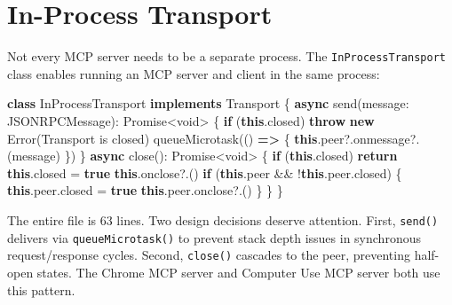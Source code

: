 \documentclass[
  english,
  11pt,
  letterpaper,
]{book}
\newenvironment{Shaded}{\begin{snugshade}}{\end{snugshade}}
\newcommand{\AttributeTok}[1]{\textcolor[rgb]{0.40,0.45,0.13}{#1}}
\newcommand{\BuiltInTok}[1]{\textcolor[rgb]{0.00,0.23,0.31}{#1}}
\newcommand{\ControlFlowTok}[1]{\textcolor[rgb]{0.00,0.23,0.31}{\textbf{#1}}}
\newcommand{\DataTypeTok}[1]{\textcolor[rgb]{0.68,0.00,0.00}{#1}}
\newcommand{\FunctionTok}[1]{\textcolor[rgb]{0.28,0.35,0.67}{#1}}
\newcommand{\KeywordTok}[1]{\textcolor[rgb]{0.00,0.23,0.31}{\textbf{#1}}}
\newcommand{\NormalTok}[1]{\textcolor[rgb]{0.00,0.23,0.31}{#1}}
\newcommand{\OperatorTok}[1]{\textcolor[rgb]{0.37,0.37,0.37}{#1}}
\newcommand{\StringTok}[1]{\textcolor[rgb]{0.13,0.47,0.30}{#1}}
\begin{document}
\section{In-Process Transport}\label{in-process-transport}

Not every MCP server needs to be a separate process. The
\texttt{InProcessTransport} class enables running an MCP server and
client in the same process:

\begin{Shaded}
\begin{Highlighting}[]
\KeywordTok{class}\NormalTok{ InProcessTransport }\KeywordTok{implements}\NormalTok{ Transport \{}
  \KeywordTok{async} \FunctionTok{send}\NormalTok{(message}\OperatorTok{:}\NormalTok{ JSONRPCMessage)}\OperatorTok{:} \BuiltInTok{Promise}\OperatorTok{\textless{}}\DataTypeTok{void}\OperatorTok{\textgreater{}}\NormalTok{ \{}
    \ControlFlowTok{if}\NormalTok{ (}\KeywordTok{this}\OperatorTok{.}\AttributeTok{closed}\NormalTok{) }\ControlFlowTok{throw} \KeywordTok{new} \BuiltInTok{Error}\NormalTok{(}\StringTok{\textquotesingle{}Transport is closed\textquotesingle{}}\NormalTok{)}
    \FunctionTok{queueMicrotask}\NormalTok{(() }\KeywordTok{=\textgreater{}}\NormalTok{ \{ }\KeywordTok{this}\OperatorTok{.}\AttributeTok{peer}\OperatorTok{?.}\AttributeTok{onmessage}\OperatorTok{?.}\NormalTok{(message) \})}
\NormalTok{  \}}
  \KeywordTok{async} \FunctionTok{close}\NormalTok{()}\OperatorTok{:} \BuiltInTok{Promise}\OperatorTok{\textless{}}\DataTypeTok{void}\OperatorTok{\textgreater{}}\NormalTok{ \{}
    \ControlFlowTok{if}\NormalTok{ (}\KeywordTok{this}\OperatorTok{.}\AttributeTok{closed}\NormalTok{) }\ControlFlowTok{return}
    \KeywordTok{this}\OperatorTok{.}\AttributeTok{closed} \OperatorTok{=} \KeywordTok{true}
    \KeywordTok{this}\OperatorTok{.}\AttributeTok{onclose}\OperatorTok{?.}\NormalTok{()}
    \ControlFlowTok{if}\NormalTok{ (}\KeywordTok{this}\OperatorTok{.}\AttributeTok{peer} \OperatorTok{\&\&} \OperatorTok{!}\KeywordTok{this}\OperatorTok{.}\AttributeTok{peer}\OperatorTok{.}\AttributeTok{closed}\NormalTok{) \{}
      \KeywordTok{this}\OperatorTok{.}\AttributeTok{peer}\OperatorTok{.}\AttributeTok{closed} \OperatorTok{=} \KeywordTok{true}
      \KeywordTok{this}\OperatorTok{.}\AttributeTok{peer}\OperatorTok{.}\AttributeTok{onclose}\OperatorTok{?.}\NormalTok{()}
\NormalTok{    \}}
\NormalTok{  \}}
\NormalTok{\}}
\end{Highlighting}
\end{Shaded}

The entire file is 63 lines. Two design decisions deserve attention.
First, \texttt{send()} delivers via \texttt{queueMicrotask()} to prevent
stack depth issues in synchronous request/response cycles. Second,
\texttt{close()} cascades to the peer, preventing half-open states. The
Chrome MCP server and Computer Use MCP server both use this pattern.
\end{document}
